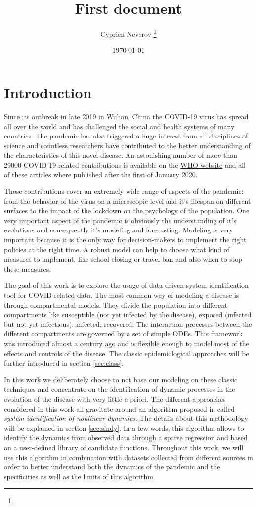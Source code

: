 \documentclass[12pt, letterpaper]{article}
\title{First document}
\author{Cyprien Neverov \thanks{}}
\date{\today}
\begin{document}
\tableofcontents


\section{Introduction}
Since its outbreak in late 2019 in Wuhan, China the COVID-19 virus has spread all over the world and has challenged the social and health systems of many countries. 
The pandemic has also triggered a huge interest from all disciplines of science and countless researchers have contributed to the better understanding of the characteristics of this novel disease. 
An astonishing number of more than 29000 COVID-19 related contributions is available on the \href{https://search.bvsalud.org/global-literature-on-novel-coronavirus-2019-ncov/}{WHO website} and all of these articles where published after the first of January 2020.

Those contributions cover an extremely wide range of aspects of the pandemic: from the behavior of the virus on a microscopic level and it's lifespan on different surfaces to the impact of the lockdown on the psychology of the population. 
One very important aspect of the pandemic is obviously the understanding of it's evolutions and consequently it's modeling and forecasting. 
Modeling is very important because it is the only way for decision-makers to implement the right policies at the right time. 
A robust model can help to choose what kind of measures to implement, like school closing or travel ban and also when to stop these measures.

The goal of this work is to explore the usage of data-driven system identification tool for COVID-related data. 
The most common way of modeling a disease is through compartmental models. 
They divide the population into different compartments like susceptible (not yet infected by the disease), exposed (infected but not yet infectious), infected, recovered. 
The interaction processes between the different compartments are governed by a set of simple ODEs. 
This framework was introduced almost a century ago and is flexible enough to model most of the effects and controls of the disease. 
The classic epidemiological approaches will be further introduced in section \ref{sec:class}.

In this work we deliberately choose to not base our modeling on these classic techniques and concentrate on the identification of dynamic processes in the evolution of the disease with very little a priori.
The different approaches considered in this work all gravitate around an algorithm proposed in \cite{sindy} called {\em system identification of nonlinear dynamics}. 
The details about this methodology will be explained in section \ref{sec:sindy}. 
In a few words, this algorithm allows to identify the dynamics from observed data through a sparse regression and based on a user-defined library of candidate functions. 
Throughout this work, we will use this algorithm in combination with datasets collected from different sources in order to better understand both the dynamics of the pandemic and the specificities as well as the limits of this algorithm. 
\end{document}
